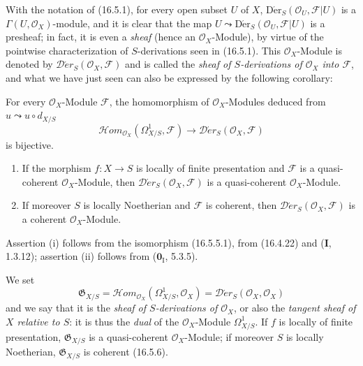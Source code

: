 \begin{env}[16.5.4]\label{IV.16.5.4}
With the notation of (16.5.1), for every open subset $U$ of $X$,
$\operatorname{D\acute{e}r}_S(\mathcal{O}_U,\mathscr{F}|U)$ is a
$\Gamma(U,\mathcal{O}_X)$-module, and it is clear that the map
$U\leadsto\operatorname{D\acute{e}r}_S(\mathcal{O}_U,\mathscr{F}|U)$ is a
presheaf; in fact, it is even a \emph{sheaf} (hence an
$\mathcal{O}_X$-Module), by virtue of the pointwise characterization of
$S$-derivations seen in (16.5.1). This $\mathcal{O}_X$-Module is denoted by
$\mathscr{D}\!\acute{e}r_S(\mathcal{O}_X,\mathscr{F})$ and is called the
\emph{sheaf of $S$-derivations of $\mathcal{O}_X$ into $\mathscr{F}$}, and
what we have just seen can also be expressed by the following corollary:
\end{env}

\begin{corollary}[16.5.5]
\label{IV.16.5.5}
For every $\mathcal{O}_X$-Module $\mathscr{F}$, the homomorphism of
$\mathcal{O}_X$-Modules deduced from $u\leadsto u\circ d_{X/S}$
\[
  \mathscr{H}\!om_{\mathcal{O}_X}(\varOmega_{X/S}^1,\mathscr{F})
  \longrightarrow
  \mathscr{D}\!\acute{e}r_S(\mathcal{O}_X,\mathscr{F})
  \tag{16.5.5.1}
  \label{IV.16.5.5.1}
\]
is bijective.
\end{corollary}

\begin{corollary}[16.5.6]
\label{IV.16.5.6}
\begin{enumerate}
\item[\textup{(i)}] If the morphism $f:X\to S$ is locally of finite presentation and
$\mathscr{F}$ is a quasi-coherent $\mathcal{O}_X$-Module, then
$\mathscr{D}\!\acute{e}r_S(\mathcal{O}_X,\mathscr{F})$ is a
quasi-coherent $\mathcal{O}_X$-Module.
\item[\textup{(ii)}] If moreover $S$ is locally Noetherian and $\mathscr{F}$ is
coherent, then $\mathscr{D}\!\acute{e}r_S(\mathcal{O}_X,\mathscr{F})$ is a
coherent $\mathcal{O}_X$-Module.
\end{enumerate}
\end{corollary}

Assertion (i) follows from the isomorphism (16.5.5.1), from (16.4.22) and
(\textbf{I}, 1.3.12); assertion (ii) follows from ($\mathbf{0}_{\mathrm I}$, 5.3.5).

\begin{env}[16.5.7]\label{IV.16.5.7}
We set
\[
  \mathfrak{G}_{X/S}=
  \mathscr{H}\!om_{\mathcal{O}_X}(\varOmega_{X/S}^1,\mathcal{O}_X)
  =\mathscr{D}\!\acute{e}r_S(\mathcal{O}_X,\mathcal{O}_X)
  \tag{16.5.7.1}
  \label{IV.16.5.7.1}
\]
and we say that it is the \emph{sheaf of $S$-derivations of
$\mathcal{O}_X$}, or also the \emph{tangent sheaf of $X$ relative to
$S$}: it is thus the \emph{dual} of the $\mathcal{O}_X$-Module
$\varOmega_{X/S}^1$. If $f$ is locally of finite
presentation, $\mathfrak{G}_{X/S}$ is a quasi-coherent $\mathcal{O}_X$-Module; if
moreover $S$ is locally Noetherian, $\mathfrak{G}_{X/S}$ is coherent
(16.5.6).
\end{env}

